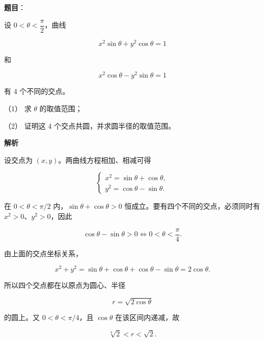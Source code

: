 \begin{answer}

\textbf{题目}：

设 $0<\theta<\dfrac\pi2$，曲线

\nopagebreak[4]
\[
x^2\sin\theta+y^2\cos\theta=1
\]

和

\nopagebreak[4]
\[
x^2\cos\theta-y^2\sin\theta=1
\]

有 4 个不同的交点。

（1） 求 $\theta$ 的取值范围；

（2） 证明这 4 个交点共圆，并求圆半径的取值范围。

\textbf{解析}


设交点为 $(x,y)$。两曲线方程相加、相减可得

\nopagebreak[4]
\[
\begin{cases}
x^2=\sin\theta+\cos\theta,\\
y^2=\cos\theta-\sin\theta.
\end{cases}
\]

在 $0<\theta<\pi/2$ 内，$\sin\theta+\cos\theta>0$ 恒成立。要有四个不同的交点，必须同时有 $x^2>0$、$y^2>0$，因此

\nopagebreak[4]
\[
\cos\theta-\sin\theta>0
\Longleftrightarrow 0<\theta<\frac\pi4.
\]


由上面的交点坐标关系，

\nopagebreak[4]
\[
x^2+y^2
=\sin\theta+\cos\theta+\cos\theta-\sin\theta
=2\cos\theta.
\]

所以四个交点都在以原点为圆心、半径

\nopagebreak[4]
\[
r=\sqrt{2\cos\theta}
\]

的圆上。又 $0<\theta<\pi/4$，且 $\cos\theta$ 在该区间内递减，故

\nopagebreak[4]
\[
\sqrt[4]{2}<r<\sqrt2.
\]



\end{answer}